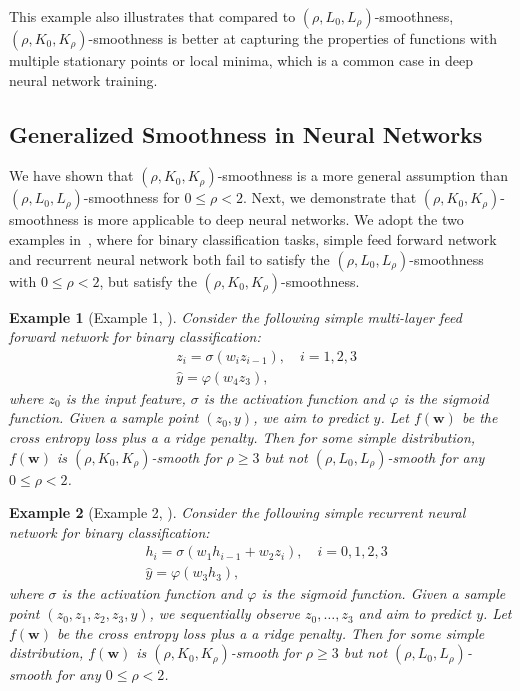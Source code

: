 \documentclass{article}
\newtheorem{example}{Example}
\newcommand{\Kr}{K_{\rho}}
\newcommand{\bw}{\mathbf{w}}
\begin{document}
This example also illustrates that compared to $(\rho,L_0,L_\rho)$-smoothness, $(\rho,K_0,\Kr)$-smoothness is better at capturing the properties of functions with multiple stationary points or local minima, which is a common case in deep neural network training.

\subsection{Generalized Smoothness in Neural Networks}\label{sec:FamilySmoothness_nerualnets}

We have shown that $(\rho,K_0,\Kr)$-smoothness is a more general assumption than $(\rho,L_0,L_\rho)$-smoothness for $0\le \rho<2$. Next, we demonstrate that  $(\rho,K_0,\Kr)$-smoothness is more applicable to deep neural networks. We adopt the two examples in~\cite{patel2022global}, where for binary classification tasks, simple feed forward network and recurrent neural network both fail to satisfy the $(\rho,L_0,L_\rho)$-smoothness with $0\leq\rho<2$, but satisfy the 
$(\rho,K_0,K_\rho)$-smoothness.

\begin{example}[Example 1, \cite{patel2022global}]
    Consider the following simple multi-layer feed forward network for binary classification:
    \begin{align*}
        &z_i=\sigma\left(w_iz_{i-1}\right),\quad i=1,2,3\\
        &\hat{y}=\varphi\left(w_4z_3\right),
    \end{align*}
    where $z_0$ is the input feature, $\sigma$ is the activation function and $\varphi$ is the sigmoid function.
    Given a sample point $(z_0,y)$, we aim to predict $y$.
    Let $f(\bw)$ be the cross entropy loss plus a a ridge penalty.
    Then for some simple distribution, $f(\bw)$ is $(\rho, K_0, K_\rho)$-smooth for $\rho\geq 3$ but not $(\rho, L_0, L_\rho)$-smooth for any $0\leq\rho<2$.
\end{example}


\begin{example}[Example 2, \cite{patel2022global}]
    Consider the following simple recurrent neural network for binary classification:
    \begin{align*}
        &h_i=\sigma\left(w_1 h_{i-1}+w_2 z_i\right),\quad i=0,1,2,3\\
        & \hat{y}=\varphi(w_3h_3),
    \end{align*}
    where $\sigma$ is the activation function and $\varphi$ is the sigmoid function. Given a sample point $(z_0,z_1,z_2,z_3,y)$, 
    we sequentially observe $z_0,\dots,z_3$ and aim to predict $y$.
    Let $f(\bw)$ be the cross entropy loss plus a a ridge penalty.
    Then for some simple distribution, $f(\bw)$ is $(\rho, K_0, K_\rho)$-smooth for $\rho\geq 3$ but not $(\rho, L_0, L_\rho)$-smooth for any $0\leq\rho<2$.
\end{example}
\end{document}
